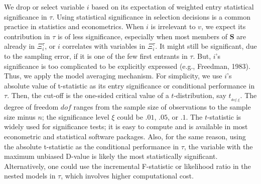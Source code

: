 \documentclass[a4paper,12pt]{article}
\begin{document}
We drop or select variable $i$ based on its expectation of weighted entry statistical significance in $\tau$.
Using statistical significance in selection decisions is a common practice in statistics and econometrics.
When $i$ is irrelevant to $v$, we expect its contribution in $\tau$ is of less significance, especially when most members of $\mathbf{S}$ are already in $\Xi_i^\tau$, or $i$ correlates with variables in $\Xi_i^\tau$.
It might still be significant, due to the sampling error,  if it is one of the few first entrants in $\tau$. 
But, $i$'s significance is too complicated to be explicitly expressed (e.g., Freedman, 1983). Thus, we apply the model averaging mechanism.
For simplicity, we use $i$'s absolute value of t-statistic as its entry significance or conditional performance in $\tau$. 
Then, the cut-off is the one-sided critical value of a $t$-distribution, say $t_{_{dof,\xi}}$.
The degree of freedom $dof$ ranges from the sample size of observations to the sample size minus $n$; the significance level $\xi$ could be $.01$, $.05$, or $.1$.
The $t$-statistic is widely used for significance tests; it is easy to compute and is available in most econometric and statistical software packages.
Also, for the same reason, using the absolute t-statistic as the conditional performance in $\tau$, the variable with the maximum unbiased D-value is likely the most statistically significant.
Alternatively, one could use the incremental F-statistic or likelihood ratio in the nested models in $\tau$, which involves higher computational cost.
\end{document}
